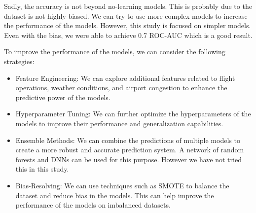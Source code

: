 \documentclass[conference]{IEEEtran}
\begin{document}
Sadly, the accuracy is not beyond no-learning models. This is probably due to the dataset is not highly biased. We can try to use more complex models to increase the performance of the models. However, this study is focused on simpler models. Even with the bias, we were able to achieve 0.7 ROC-AUC which is a good result.

To improve the performance of the models, we can consider the following strategies:

\begin{itemize}
    \item Feature Engineering: We can explore additional features related to flight operations, weather conditions, and airport congestion to enhance the predictive power of the models.
    \item Hyperparameter Tuning: We can further optimize the hyperparameters of the models to improve their performance and generalization capabilities.
    \item Ensemble Methods: We can combine the predictions of multiple models to create a more robust and accurate prediction system. A network of random forests and DNNs can be used for this purpose. However we have not tried this in this study.
    \item Bias-Resolving: We can use techniques such as SMOTE to balance the dataset and reduce bias in the models. This can help improve the performance of the models on imbalanced datasets.
\end{itemize}
\end{document}
